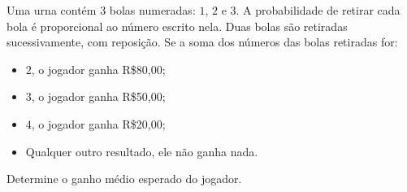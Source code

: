 %
%


\begin{exercicioBanco}[\valorquestao]
    Uma urna contém 3 bolas numeradas: $1$, $2$ e $3$. A probabilidade de retirar cada bola é proporcional ao número escrito nela. Duas bolas são retiradas sucessivamente, com reposição. Se a soma dos números das bolas retiradas for:

\begin{itemize}
    \item $2$, o jogador ganha R\$80,00;
    \item $3$, o jogador ganha R\$50,00;
    \item $4$, o jogador ganha R\$20,00;
    \item Qualquer outro resultado, ele não ganha nada.
\end{itemize}

    Determine o ganho médio esperado do jogador.
\end{exercicioBanco}

